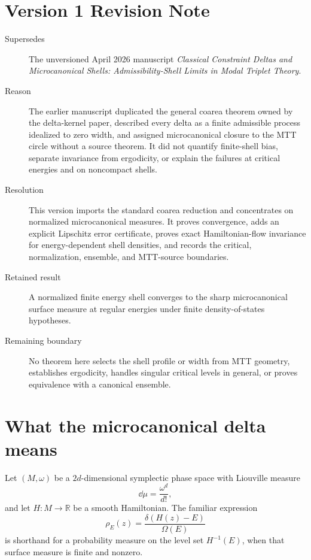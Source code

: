 \documentclass[11pt]{article}
\begin{document}
\section*{Version 1 Revision Note}
\begin{description}
\item[Supersedes] The unversioned April 2026 manuscript
\emph{Classical Constraint Deltas and Microcanonical Shells:
Admissibility-Shell Limits in Modal Triplet Theory}.
\item[Reason] The earlier manuscript duplicated the general coarea theorem
owned by the delta-kernel paper, described every delta as a finite admissible
process idealized to zero width, and assigned microcanonical closure to the
MTT circle without a source theorem. It did not quantify finite-shell bias,
separate invariance from ergodicity, or explain the failures at critical
energies and on noncompact shells.
\item[Resolution] This version imports the standard coarea reduction and
concentrates on normalized microcanonical measures. It proves convergence,
adds an explicit Lipschitz error certificate, proves exact Hamiltonian-flow
invariance for energy-dependent shell densities, and records the critical,
normalization, ensemble, and MTT-source boundaries.
\item[Retained result] A normalized finite energy shell converges to the sharp
microcanonical surface measure at regular energies under finite
density-of-states hypotheses.
\item[Remaining boundary] No theorem here selects the shell profile or width
from MTT geometry, establishes ergodicity, handles singular critical levels in
general, or proves equivalence with a canonical ensemble.
\end{description}

\tableofcontents

\section{What the microcanonical delta means}

Let \((M,\omega)\) be a \(2d\)-dimensional symplectic phase space with
Liouville measure
\[
\dd\mu=\frac{\omega^d}{d!},
\]
and let \(H:M\to\mathbb R\) be a smooth Hamiltonian. The familiar expression
\[
\rho_E(z)
=
\frac{\delta(H(z)-E)}{\Omega(E)}
\]
is shorthand for a probability measure on the level set \(H^{-1}(E)\), when
that surface measure is finite and nonzero.
\end{document}
